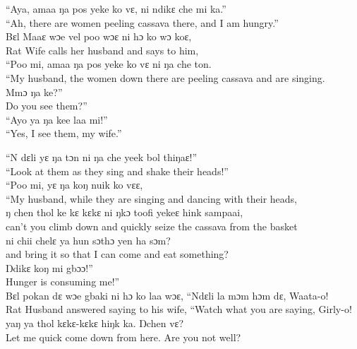 “Aya, amaa ŋa pos yeke ko vɛ, ni ndikɛ che mi ka.”\\
“Ah, there are women peeling cassava there, and I am hungry.”\\

Bɛl Maaɛ wɔe vel poo wɔɛ ni hɔ ko wɔ koɛ,\\
Rat Wife calls her husband and says to him,\\

“Poo mi, amaa ŋa pos yeke ko vɛ ni ŋa che ton.\\ 
“My husband, the women down there are peeling cassava and are singing.\\ 

Mmɔ ŋa ke?”\\
Do you see them?”\\

“Ayo ya ŋa kee laa mi!”\\
“Yes, I see them, my wife.”\\

\newpage

“N dɛli yɛ ŋa tɔn ni ŋa che yeek bol thiŋaɛ!”\\
“Look at them as they sing and shake their heads!”\\

“Poo mi, yɛ ŋa koŋ nuik ko vɛɛ,\\
“My husband, while they are singing and dancing with their heads,\\

ŋ chen thol ke kɛ kɛkɛ ni ŋkɔ toofi yekeɛ hink sampaai,\\
can’t you climb down and quickly seize the cassava from the basket\\

ni chii chelɛ ya hun sɔthɔ yen ha sɔm?\\
and bring it so that I can come and eat something?\\

Ŋdikɛ koŋ mi gbɔɔ!”\\
Hunger is consuming me!”\\

Bɛl pokan dɛ wɔe gbaki ni hɔ ko laa wɔɛ, “Ndɛli la mɔm hɔm dɛ, Waata-o!\\
Rat Husband answered saying to his wife, “Watch what you are saying, Girly-o!\\

yaŋ ya thol kɛkɛ-kɛkɛ hiŋk ka. Ŋchen vɛ?\\
Let me quick come down from here. Are you not well?\\

